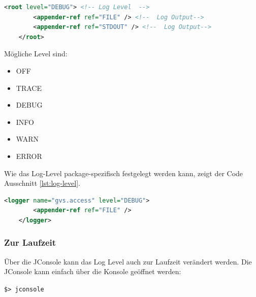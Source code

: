 \documentclass[11pt,a4paper,english,oneside]{book}
\numberwithin{equation}{chapter}
\begin{document}
	\begin{lstlisting}[language=xml, frame=single, caption={Root Log Level verändern}, label={lst:root-log-level}]
	<root level="DEBUG"> <!-- Log Level  -->
		<appender-ref ref="FILE" /> <!--  Log Output-->
		<appender-ref ref="STDOUT" /> <!--  Log Output-->
	</root>
	\end{lstlisting}
	
	Mögliche Level sind:
	\begin{itemize}
		\item OFF
		\item TRACE
		\item DEBUG
		\item INFO
		\item WARN
		\item ERROR
	\end{itemize}

	Wie das Log-Level package-spezifisch festgelegt werden kann, zeigt der Code Ausschnitt \ref{lst:log-level}.
	
	\begin{lstlisting}[language=xml, frame=single, caption={Root Log Level verändern}, label={lst:log-level}]
	<logger name="gvs.access" level="DEBUG">
		<appender-ref ref="FILE" />
	</logger>
	\end{lstlisting}	

	\subsubsection{Zur Laufzeit}
	Über die JConsole kann das Log Level auch zur Laufzeit verändert werden. Die JConsole kann einfach über die Konsole geöffnet werden: 
	
	\lstinline|$> jconsole|
\end{document}
